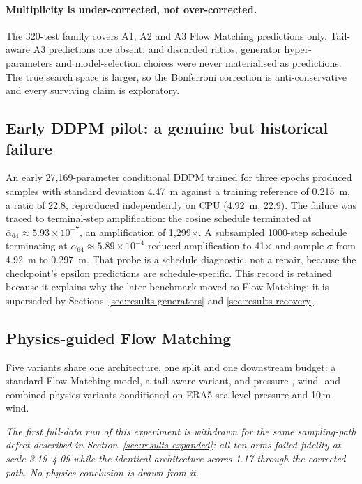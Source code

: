 \paragraph{Multiplicity is under-corrected, not over-corrected.} The 320-test
family covers A1, A2 and A3 Flow Matching predictions only. Tail-aware A3
predictions are absent, and discarded ratios, generator hyper-parameters and
model-selection choices were never materialised as predictions. The true search
space is larger, so the Bonferroni correction is anti-conservative and every
surviving claim is exploratory.

\subsection{Early DDPM pilot: a genuine but historical failure}
\label{sec:results-pilot}

An early 27,169-parameter conditional DDPM trained for three epochs produced
samples with standard deviation 4.47~m against a training reference of 0.215~m,
a ratio of 22.8, reproduced independently on CPU (4.92~m, 22.9). The failure was
traced to terminal-step amplification: the cosine schedule terminated at
$\bar\alpha_{64}\approx5.93\times10^{-7}$, an amplification of 1,299$\times$. A
subsampled 1000-step schedule terminating at
$\bar\alpha_{64}\approx5.89\times10^{-4}$ reduced amplification to 41$\times$
and sample $\sigma$ from 4.92~m to 0.297~m. That probe is a schedule diagnostic,
not a repair, because the checkpoint's epsilon predictions are schedule-specific.
This record is retained because it explains why the later benchmark moved to
Flow Matching; it is superseded by Sections~\ref{sec:results-generators} and
\ref{sec:results-recovery}.

\subsection{Physics-guided Flow Matching}
\label{sec:results-physics}

Five variants share one architecture, one split and one downstream budget: a
standard Flow Matching model, a tail-aware variant, and pressure-, wind- and
combined-physics variants conditioned on ERA5 sea-level pressure and 10\,m wind.

\emph{The first full-data run of this experiment is withdrawn for the same
sampling-path defect described in Section~\ref{sec:results-expanded}: all ten
arms failed fidelity at scale 3.19--4.09 while the identical architecture scores
1.17 through the corrected path. No physics conclusion is drawn from it.}

